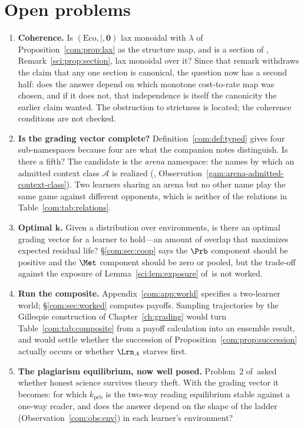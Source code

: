 \section{Open problems}\label{com:S15}

\begin{enumerate}[itemsep=4pt]
\item \textbf{Coherence.} Is $(\mathrm{Eco}, \mid, \mathbf{0})$ lax monoidal with
$\lambda$ of Proposition~\ref{com:prop:lax} as the structure map, and is a section of
\chSci, Remark~\ref{sci:prop:section}, lax monoidal over it? Since that remark withdraws the claim
that any one section is canonical, the question now has a second half: does the answer depend on which
monotone cost-to-rate map was chosen, and if it does not, that independence is itself the canonicity
the earlier claim wanted. The obstruction to strictness is located; the coherence conditions are not
checked.

\item \textbf{Is the grading vector complete?} Definition~\ref{com:def:typed} gives four
sub-namespaces because four are what the companion notes distinguish. Is there a fifth? The
candidate is the \emph{arena} namespace: the names by which an admitted context class
$\mathcal{A}$ is realized (\chGame, Observation~\ref{gam:arena-admitted-context-class}). Two learners sharing an arena but no other name
play the same game against different opponents, which is neither of the relations in
Table~\ref{com:tab:relations}.

\item \textbf{Optimal $\mathbf{k}$.} Given a distribution over environments, is there an optimal
grading vector for a learner to hold---an amount of overlap that maximizes expected residual
life? \S\ref{com:sec:coop} says the $\Prb$ component should be positive and the $\Met$ component
should be zero or pooled, but the trade-off against the exposure of Lemma~\ref{sci:lem:exposure}
of~\chSci is not worked.

\item \textbf{Run the composite.} Appendix~\ref{com:app:world} specifies a two-learner world;
\S\ref{com:sec:worked} computes payoffs. Sampling trajectories by the Gillespie construction
of Chapter~\ref{ch:grading} would turn Table~\ref{com:tab:composite} from a payoff calculation into an
ensemble result, and would settle whether the succession of Proposition~\ref{com:prop:succession}
actually occurs or whether $\Lrn_A$ starves first.

\item \textbf{The plagiarism equilibrium, now well posed.} Problem~2 of~\chSci asked
whether honest science survives theory theft. With the grading vector it becomes: for which
$k_{\mathrm{prb}}$ is the two-way reading equilibrium stable against a one-way reader, and does
the answer depend on the shape of the ladder (Observation~\ref{com:obs:env}) in each learner's
environment?


\end{enumerate}
